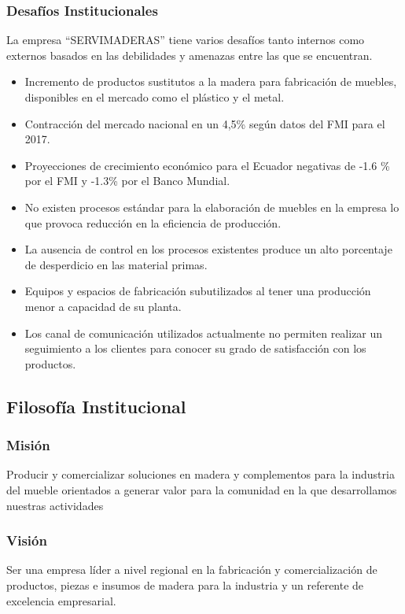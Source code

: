 \documentclass[12pt, a4paper]{article}
\begin{document}
\subsubsection{Desafíos Institucionales}
La empresa ``SERVIMADERAS'' tiene varios desafíos tanto internos como externos basados en las  debilidades y amenazas entre las que se encuentran.
\begin{itemize}
	\item Incremento de productos sustitutos a la madera para fabricación de muebles, disponibles en el mercado como el plástico y el metal.
	\item Contracción del mercado nacional en un 4,5\% según datos del FMI para el 2017.
	\item Proyecciones de crecimiento económico para el Ecuador negativas de  -1.6 \% por el FMI y -1.3\% por el Banco Mundial.
	\item No existen procesos estándar para la elaboración de muebles en la empresa lo que provoca  reducción en la eficiencia de producción.
	\item La ausencia de control en los procesos existentes   produce un alto porcentaje de desperdicio en las  material primas.
	\item Equipos y espacios de fabricación subutilizados al tener una producción menor a capacidad de su planta.
	\item Los canal de comunicación utilizados actualmente no permiten realizar un seguimiento a los clientes para conocer su grado de satisfacción con los productos.
\end{itemize}
	
\subsection{Filosofía Institucional}
\subsubsection{Misión}
Producir y comercializar soluciones en madera y complementos para la industria del mueble  orientados a generar valor para la comunidad en la que desarrollamos nuestras actividades
\subsubsection{Visión}
Ser una empresa líder a nivel regional en la fabricación y comercialización de productos, piezas e insumos de madera para la industria y un referente de excelencia empresarial.
\end{document}
